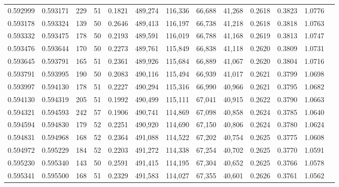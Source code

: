 \begin{tabular}{rrrrrrrrrrrrr}
0.592999 & 0.593171 &   229 &  51 &                                     0.1821 & 489,274 & 116,336 &  66,688 &  41,268 & 0.2618 & 0.3823 & 1.0776 \\
0.593178 & 0.593324 &   139 &  50 &                                     0.2646 & 489,413 & 116,197 &  66,738 &  41,218 & 0.2618 & 0.3818 & 1.0763 \\
0.593332 & 0.593475 &   178 &  50 &                                     0.2193 & 489,591 & 116,019 &  66,788 &  41,168 & 0.2619 & 0.3813 & 1.0747 \\
0.593476 & 0.593644 &   170 &  50 &                                     0.2273 & 489,761 & 115,849 &  66,838 &  41,118 & 0.2620 & 0.3809 & 1.0731 \\
0.593645 & 0.593791 &   165 &  51 &                                     0.2361 & 489,926 & 115,684 &  66,889 &  41,067 & 0.2620 & 0.3804 & 1.0716 \\
0.593791 & 0.593995 &   190 &  50 &                                     0.2083 & 490,116 & 115,494 &  66,939 &  41,017 & 0.2621 & 0.3799 & 1.0698 \\
0.593997 & 0.594130 &   178 &  51 &                                     0.2227 & 490,294 & 115,316 &  66,990 &  40,966 & 0.2621 & 0.3795 & 1.0682 \\
0.594130 & 0.594319 &   205 &  51 &                                     0.1992 & 490,499 & 115,111 &  67,041 &  40,915 & 0.2622 & 0.3790 & 1.0663 \\
0.594321 & 0.594593 &   242 &  57 &                                     0.1906 & 490,741 & 114,869 &  67,098 &  40,858 & 0.2624 & 0.3785 & 1.0640 \\
0.594594 & 0.594830 &   179 &  52 &                                     0.2251 & 490,920 & 114,690 &  67,150 &  40,806 & 0.2624 & 0.3780 & 1.0624 \\
0.594831 & 0.594968 &   168 &  52 &                                     0.2364 & 491,088 & 114,522 &  67,202 &  40,754 & 0.2625 & 0.3775 & 1.0608 \\
0.594972 & 0.595229 &   184 &  52 &                                     0.2203 & 491,272 & 114,338 &  67,254 &  40,702 & 0.2625 & 0.3770 & 1.0591 \\
0.595230 & 0.595340 &   143 &  50 &                                     0.2591 & 491,415 & 114,195 &  67,304 &  40,652 & 0.2625 & 0.3766 & 1.0578 \\
0.595341 & 0.595500 &   168 &  51 &                                     0.2329 & 491,583 & 114,027 &  67,355 &  40,601 & 0.2626 & 0.3761 & 1.0562 \\

\end{tabular}
